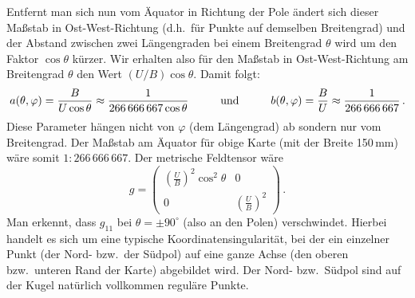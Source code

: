 Entfernt man sich nun vom \"Aquator in Richtung der Pole \"andert sich
dieser Ma\ss stab in Ost-West-Richtung (d.h.\ f\"ur Punkte auf demselben Breitengrad) 
und der Abstand zwischen zwei L\"angengraden bei einem Breitengrad $\theta$ wird
um den Faktor $\cos \theta$ k\"urzer. Wir erhalten also f\"ur den Ma\ss stab in Ost-West-Richtung am
Breitengrad $\theta$ den Wert $(U/B) \cos \theta$. Damit folgt:
\begin{equation}
           a(\theta,\varphi) = \frac{B}{U\cos \theta} \approx \frac{1}{266\,666\,667 \cos \theta} \hspace{1cm} {\rm und}
           \hspace{1cm}  b(\theta,\varphi) = \frac{B}{U} \approx \frac{1}{266\,666\,667}  \, .  
\end{equation}
Diese Parameter h\"angen nicht von $\varphi$ (dem L\"angengrad) ab sondern nur vom Breitengrad.
Der Ma\ss stab am \"Aquator f\"ur obige Karte (mit der Breite 150\,mm) w\"are somit $1:266\,666\,667$. 
Der metrische Feldtensor w\"are
\begin{equation}
               g = \left( \begin{array}{cc}   \left( \frac{U}{B} \right)^2  \cos^2 \theta & 0 \\ 0 & \left( \frac{U}{B} \right)^2
               \end{array} \right) \, .
\end{equation}
Man erkennt, dass $g_{11}$ bei $\theta=\pm 90^\circ$ (also an den Polen) verschwindet. Hierbei
handelt es sich um eine typische Koordinatensingularit\"at, 
bei der ein einzelner Punkt
(der Nord- bzw.\ der S\"udpol) auf eine ganze Achse (den oberen bzw.\ unteren Rand der Karte)
abgebildet wird. Der Nord- bzw.\ S\"udpol sind auf der Kugel nat\"urlich vollkommen regul\"are
Punkte. 

